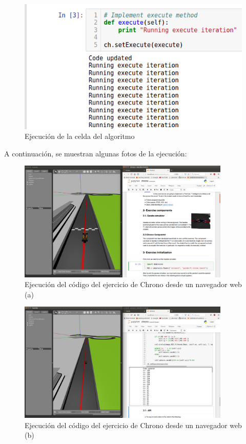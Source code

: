 \begin{figure}[H]
	\begin{center}
    \centering
    \includegraphics[width=.7\textwidth]{figures/ejecucion_chrono_jupyter.png}
		\caption{Ejecución de la celda del algoritmo}
		\label{fig.ecj}
	\end{center}
\end{figure}

A continuación, se muestran algunas fotos de la ejecución:

\begin{figure}[H]
  \begin{center}
    \includegraphics[width=0.9\textwidth]{figures/ejec_1_jup_ch.png}
		\caption{Ejecución del código del ejercicio de Chrono desde un navegador web (a)}
		\label{fig.ecjfr1}
		\end{center}
\end{figure}

\begin{figure}[H]
  \begin{center}
    \includegraphics[width=0.9\textwidth]{figures/ejec_2_jup_ch.png}
		\caption{Ejecución del código del ejercicio de Chrono desde un navegador web (b)}
		\label{fig.ecjfr2}
		\end{center}
\end{figure}

